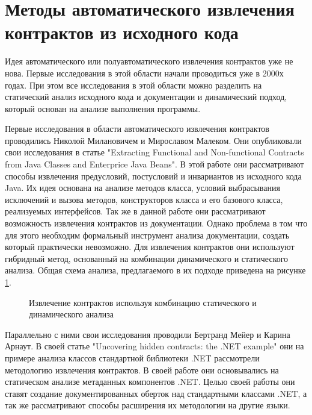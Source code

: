 \section{Методы автоматического извлечения контрактов из исходного кода}
Идея автоматического или полуавтоматического извлечения контрактов уже не нова. Первые исследования в этой области начали проводиться уже в 2000х годах. При этом все исследования в этой области можно разделить на статический анализ исходного кода и документации и динамический подход, который основан на анализе выполнения программы.

Первые исследования в области автоматического извлечения контрактов проводились Николой Милановичем и Мирославом Малеком. Они опубликовали свои исследования в статье "Extracting Functional and Non-functional Contracts from Java Classes and Enterprice Java Beans"\cite{extractingContractsFromJava}. В этой работе они рассматривают способы извлечения предусловий, постусловий и инвариантов из исходного кода Java. Их идея основана на анализе методов класса, условий выбрасывания исключений и вызова методов, конструкторов класса и его базового класса, реализуемых интерфейсов. Так же в данной работе они рассматривают возможность извлечения контрактов из документации. Однако проблема в том что для этого необходим формальный инструмент анализа документации, создать который практически невозможно. Для извлечения контрактов они используют гибридный метод, основанный на комбинации динамического и статического анализа. Общая схема анализа, предлагаемого в их подходе приведена на рисунке \ref{image:milanovicExample}.
\begin{figure}[h!]
\caption{Извлечение контрактов используя комбинацию статического и динамического анализа}
\label{image:milanovicExample}
\end{figure}

Параллельно с ними свои исследования проводили Бертранд Мейер и Карина Арнаут. В своей статье "Uncovering hidden contracts: the .NET example" они на примере анализа классов стандартной библиотеки .NET рассмотрели методологию извлечения контрактов\cite{uncoveringHiddenContracts}. В своей работе они основывались на статическом анализе метаданных компонентов .NET. Целью своей работы они ставят создание документированных оберток над стандартными классами .NET, а так же рассматривают способы расширения их методологии на другие языки. 

